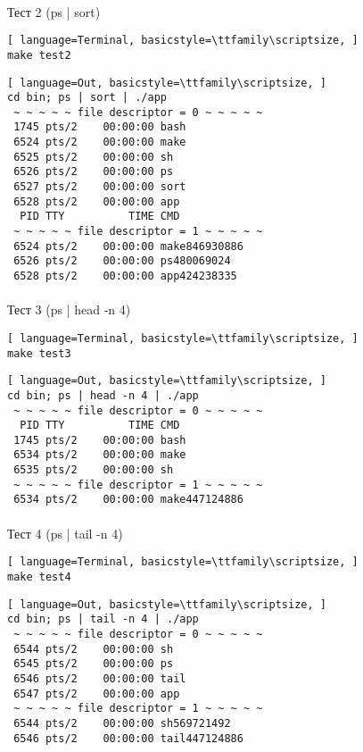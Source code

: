 \paragraph{}
Тест 2 (ps | sort)

\begin{lstlisting}[ language=Terminal, basicstyle=\ttfamily\scriptsize, ]
make test2
\end{lstlisting}

\begin{lstlisting}[ language=Out, basicstyle=\ttfamily\scriptsize, ]
cd bin; ps | sort | ./app
 ~ ~ ~ ~ ~ file descriptor = 0 ~ ~ ~ ~ ~
 1745 pts/2    00:00:00 bash
 6524 pts/2    00:00:00 make
 6525 pts/2    00:00:00 sh
 6526 pts/2    00:00:00 ps
 6527 pts/2    00:00:00 sort
 6528 pts/2    00:00:00 app
  PID TTY          TIME CMD
 ~ ~ ~ ~ ~ file descriptor = 1 ~ ~ ~ ~ ~
 6524 pts/2    00:00:00 make846930886
 6526 pts/2    00:00:00 ps480069024
 6528 pts/2    00:00:00 app424238335
\end{lstlisting}

\paragraph{}
Тест 3 (ps | head -n 4)

\begin{lstlisting}[ language=Terminal, basicstyle=\ttfamily\scriptsize, ]
make test3
\end{lstlisting}

\begin{lstlisting}[ language=Out, basicstyle=\ttfamily\scriptsize, ]
cd bin; ps | head -n 4 | ./app
 ~ ~ ~ ~ ~ file descriptor = 0 ~ ~ ~ ~ ~
  PID TTY          TIME CMD
 1745 pts/2    00:00:00 bash
 6534 pts/2    00:00:00 make
 6535 pts/2    00:00:00 sh
 ~ ~ ~ ~ ~ file descriptor = 1 ~ ~ ~ ~ ~
 6534 pts/2    00:00:00 make447124886
\end{lstlisting}

\paragraph{}
Тест 4 (ps | tail -n 4)

\begin{lstlisting}[ language=Terminal, basicstyle=\ttfamily\scriptsize, ]
make test4
\end{lstlisting}

\begin{lstlisting}[ language=Out, basicstyle=\ttfamily\scriptsize, ]
cd bin; ps | tail -n 4 | ./app
 ~ ~ ~ ~ ~ file descriptor = 0 ~ ~ ~ ~ ~
 6544 pts/2    00:00:00 sh
 6545 pts/2    00:00:00 ps
 6546 pts/2    00:00:00 tail
 6547 pts/2    00:00:00 app
 ~ ~ ~ ~ ~ file descriptor = 1 ~ ~ ~ ~ ~
 6544 pts/2    00:00:00 sh569721492
 6546 pts/2    00:00:00 tail447124886
\end{lstlisting}

